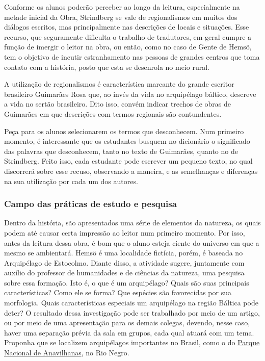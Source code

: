 \documentclass[12pt]{extarticle}
\begin{document}
Conforme os alunos poderão perceber ao longo da leitura, especialmente
na metade inicial da Obra, Strindberg se vale de regionalismos em
muitos dos diálogos escritos, mas principalmente nas descrições de
locais e situações. Esse recurso, que seguramente dificulta o trabalho
de tradutores, em geral cumpre a função de imergir o leitor na obra,
ou então, como no caso de Gente de Hemsö, tem o objetivo de incutir
estranhamento nas pessoas de grandes centros que toma contato com a
história, posto que esta se desenrola no meio rural.

A utilização de regionalismos é característica marcante do grande
escritor brasileiro Guimarães Rosa que, ao invés da vida no arquipélago
báltico, descreve a vida no sertão brasileiro. Dito isso, convém indicar
trechos de obras de Guimarães em que descrições com termos regionais são
contundentes.

Peça para os alunos selecionarem os termos que desconhecem. Num primeiro
momento, é interessante que os estudantes busquem no dicionário o
significado das palavras que desconhecem, tanto no texto de Guimarães,
quanto no de Strindberg. Feito isso, cada estudante pode escrever um
pequeno texto, no qual discorrerá sobre esse recuso, observando a
maneira, e as semelhanças e diferenças na sua utilização por cada um dos
autores.

\subsubsection{Campo das práticas de estudo e pesquisa}



Dentro da história, são apresentados uma série de elementos da
natureza, os quais podem até causar certa impressão ao leitor num
primeiro momento. Por isso, antes da leitura dessa obra, é bom que o
aluno esteja ciente do universo em que a mesmo se ambientará. Hemsö é
uma localidade fictícia, porém, é baseada no Arquipélago de Estocolmo.
Diante disso, a atividade sugere, juntamente com auxílio do professor de
humanidades e de ciências da natureza, uma pesquisa sobre essa formação.
Isto é, o que é um arquipélago? Quais são suas principais
características? Como ele se forma? Que espécies são favorecidas por sua
morfologia. Quais características especiais um arquipélago na região
Báltica pode deter? O resultado dessa investigação pode ser trabalhado
por meio de um artigo, ou por meio de uma apresentação para os demais
colegas, devendo, nesse caso, haver uma separação prévia da sala em
grupos, cada qual atuará com um tema. Proponha que se localizem arquipélagos
importantes no Brasil, como o do 
\href{https://pt.wikipedia.org/wiki/Parque_Nacional_de_Anavilhanas}{Parque Nacional de Anavilhanas}, no Rio Negro.
\end{document}
